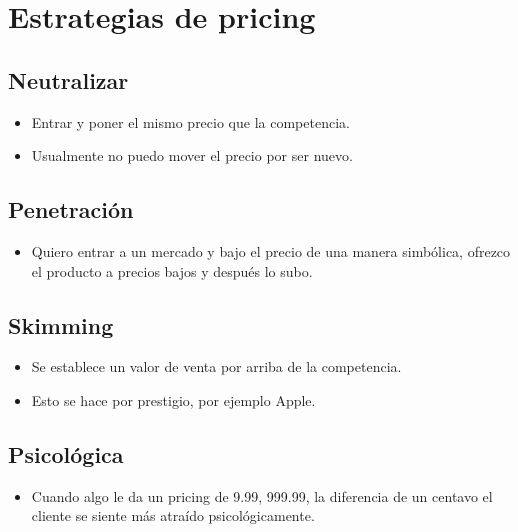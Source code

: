 \begin{itemize}
\end{itemize}



\section{Estrategias de pricing}

\subsection{Neutralizar}
\begin{itemize}
    \item Entrar y poner el mismo precio que la competencia.
    \item Usualmente no puedo mover el precio por ser nuevo.
\end{itemize}


\subsection{Penetración}
\begin{itemize}
    \item Quiero entrar a un mercado y bajo el precio de una manera simbólica, ofrezco el producto a precios bajos y después lo subo.
\end{itemize}

\subsection{Skimming}
\begin{itemize}
    \item Se establece un valor de venta por arriba de la competencia.
    \item Esto se hace por prestigio, por ejemplo Apple.
\end{itemize}


\subsection{Psicológica}
\begin{itemize}
    \item Cuando algo le da un pricing de 9.99, 999.99, la diferencia de un centavo el cliente se siente más atraído psicológicamente.
\end{itemize}

